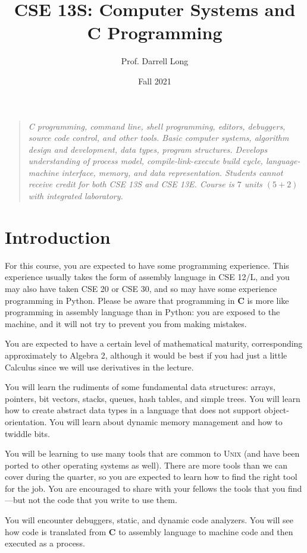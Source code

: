 \documentclass{article}
\title{CSE 13S: Computer Systems and \textbf{C} Programming}
\author{Prof.\xspace Darrell Long}
\date{Fall 2021}
\begin{document}
\maketitle
\begin{quotation}
\emph{
C programming, command line, shell programming, editors, debuggers,
source code control, and other tools. Basic computer systems,
algorithm design and development, data types, program structures.
Develops understanding of process model, compile-link-execute build
cycle, language-machine interface, memory, and data representation.
Students cannot receive credit for both CSE 13S and CSE 13E. Course
is $7$ units $(5 + 2)$ with integrated laboratory.
}
\end{quotation}

\section{Introduction}

For this course, you are expected to have some programming experience.
This experience usually takes the form of assembly language in CSE
12/L, and you may also have taken CSE 20 or CSE 30, and so may have
some experience programming in Python. Please be aware that programming
in \textbf{C} is more like programming in assembly language than
in Python: you are exposed to the machine, and it will not try to
prevent you from making mistakes.

You are expected to have a certain level of mathematical maturity,
corresponding approximately to Algebra 2, although it would be best if
you had just a little Calculus since we will use derivatives in the
lecture.

You will learn the rudiments of some fundamental data structures:
arrays, pointers, bit vectors, stacks, queues, hash tables, and simple
trees. You will learn how to create abstract data types in a language
that does not support object-orientation. You will learn about dynamic
memory management and how to twiddle bits.

You will be learning to use many tools that are common to \textsc{Unix}
(and have been ported to other operating systems as well). There are
more tools than we can cover during the quarter, so you are expected to
learn how to find the right tool for the job. You are encouraged to
share with your fellows the tools that you find---but not the code that
you write to use them.

You will encounter debuggers, static, and dynamic code analyzers. You
will see how code is translated from \textbf{C} to assembly language to
machine code and then executed as a process.
\end{document}
